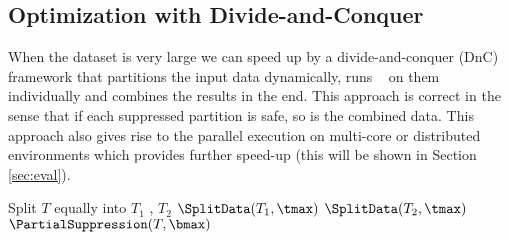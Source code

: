 %
%
%

\subsection{Optimization with Divide-and-Conquer}
\label{algo:impmentation}

When the dataset is very large we can speed up by
a divide-and-conquer (DnC) framework that
partitions the input data dynamically,
runs \PartialSuppression~
on them individually and combines the results in the end. This approach is
correct in the sense that if each suppressed partition is safe, so is the
combined data. This approach also gives rise to the parallel execution
on multi-core or distributed environments which provides further speed-up
(this will be shown in Section \ref{sec:eval}).

\begin{algorithm}
\caption{$\SplitData(T,\tmax)$} \label{algo:splitdata}
\begin{algorithmic}[1]
        \STATE Split $T$ equally into $T_1$ , $T_2$
        \STATE $\SplitData(T_1,  \tmax)$
        \STATE $\SplitData(T_2, \tmax)$
    \ELSE
        \STATE $\PartialSuppression(T,  \bmax)$
    \ENDIF
\end{algorithmic}
\end{algorithm}

